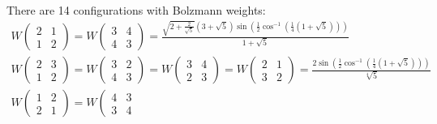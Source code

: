 \documentclass[12pt]{article}
\begin{document}
There are 14 configurations with Bolzmann weights:
\begin{equation}
  \label{eq:12}
  \begin{array}{l}
    W\left(                                          
        \begin{array}{cc}
          2 & 1 \\
          1 & 2
        \end{array}
      \right)=
    W\left(
        \begin{array}{cc}
          3 & 4 \\
          4 & 3
        \end{array}
      \right)=
\frac{\sqrt{2+\frac{2}{\sqrt{5}}}
      \left(3+\sqrt{5}\right) \sin \left(\frac{1}{2} \cos^{-1}\left(\frac{1}{4}
          \left(1+\sqrt{5}\right)\right)\right)}{1+\sqrt{5}}\\
    W\left(                                      
        \begin{array}{cc}
          2 & 3 \\
          1 & 2
        \end{array}
      \right)=
    W\left(                                         
        \begin{array}{cc}
          3 & 2 \\
          4 & 3
        \end{array}
      \right)=    W\left(                                         
        \begin{array}{cc}
          3 & 4 \\
          2 & 3
        \end{array}
      \right)=    W\left(                                         
        \begin{array}{cc}
          2 & 1 \\
          3 & 2
        \end{array}
      \right)=\frac{2 \sin \left(\frac{1}{2} \cos^{-1}\left(\frac{1}{4}
          \left(1+\sqrt{5}\right)\right)\right)}{\sqrt[4]{5}}\\
    W\left(                                         
        \begin{array}{cc}
          1 & 2 \\
          2 & 1
        \end{array}
      \right)= 
      W\left(                                                  
        \begin{array}{cc}
          4 & 3 \\
          3 & 4

\end{array}
\end{array}
\end{equation}
\end{document}
